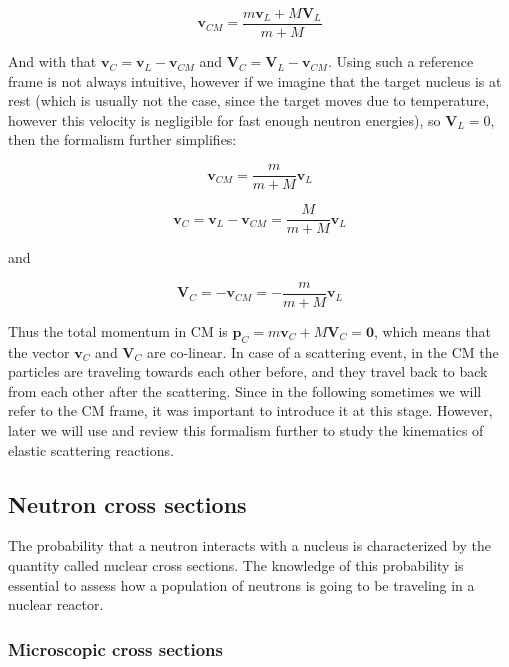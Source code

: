 \begin{equation}
\mathbf{v}_{CM} = \frac{m\mathbf{v}_L+M\mathbf{V}_L}{m+M}
\end{equation}

And with that $\mathbf{v}_C=\mathbf{v}_L - \mathbf{v}_{CM}$ and $\mathbf{V}_C=\mathbf{V}_L - \mathbf{v}_{CM}$. Using such a reference frame is not always intuitive, however if we imagine that the target nucleus is at rest (which is usually not the case, since the target moves due to temperature, however this velocity is negligible for fast enough neutron energies), so $\mathbf{V}_L=0$, then the formalism further simplifies:

\begin{equation}
\mathbf{v}_{CM}=\frac{m}{m+M}\mathbf{v}_L
\end{equation}

\begin{equation}
\mathbf{v}_C=\mathbf{v}_L-\mathbf{v}_{CM}=\frac{M}{m+M}\mathbf{v}_L
\end{equation}

and

\begin{equation}
\mathbf{V}_C=-\mathbf{v}_{CM}=-\frac{m}{m+M}\mathbf{v}_L
\end{equation}

Thus the total momentum in CM is $\mathbf{p}_C=m\mathbf{v}_C+M\mathbf{V}_C=\mathbf{0}$, which means that the vector $\mathbf{v}_C$ and $\mathbf{V}_C$ are co-linear. In case of a scattering event, in the CM the particles are traveling towards each other before, and they travel back to back from each other after the scattering. Since in the following sometimes we will refer to the CM frame, it was important to introduce it at this stage. However, later we will use and review this formalism further to study the kinematics of elastic scattering reactions.

\subsection{Neutron cross sections}

The probability that a neutron interacts with a nucleus is characterized by the quantity called nuclear cross sections. The knowledge of this probability is essential to assess how a population of neutrons is going to be traveling in a nuclear reactor. 

\subsubsection{Microscopic cross sections}

